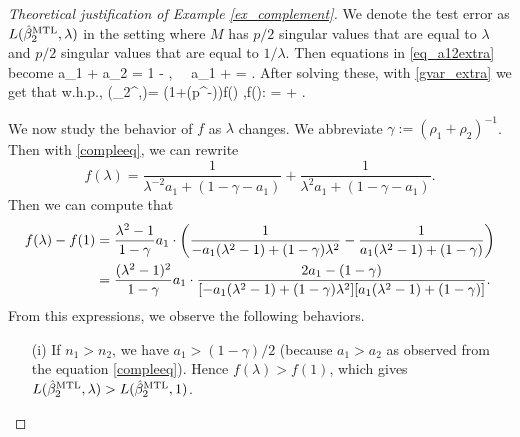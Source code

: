 \begin{proof}[Theoretical justification of Example \ref{ex_complement}]
We denote the test error as $L(\hat \beta_{2}^{\text{MTL}},\lambda)$ in the setting where $M$ has $p/2$ singular values that are equal to $\lambda$ and $p/2$ singular values that are equal to $1 / \lambda$. Then equations in \eqref{eq_a12extra} become
\be\label{compleeq} a_1 + a_2 = 1 - ,  \ \ a_1 + \cdot {} = . \ee
After solving these, with \eqref{gvar_extra} we get that w.h.p.,
\be\label{testcomple}
 \te(\hat \beta_{2}^{\MTL},\lambda)= (1+\OO(p^{-\e}))\cdot f(\lambda) ,\quad f(\lambda): =  + .\ee


We now study the behavior of $f$ as $\lambda$ changes. 
We abbreviate $\gamma:=(\rho_1 + \rho_2)^{-1}$. Then with \eqref{compleeq}, we can rewrite
$$f(\lambda)= \frac{1}{\lambda^{-2}{a_1} + (1-\gamma - a_1)} + \frac{1}{\lambda^2a_1 + (1-\gamma - a_1)}.$$
Then we can compute that
\begin{align*}
f(\lambda) - f(1)&= \frac{ \lambda^2-1}{1-\gamma} a_1\cdot \left({  \frac{1}{ -a_1(\lambda^2-1)+(1-\gamma)\lambda^2 } - \frac{1}{a_1(\lambda^2-1) + (1-\gamma)}}\right) \\
&= \frac{(\lambda^2-1)^2}{1-\gamma}  a_1\cdot  \frac{2a_1 - (1-\gamma) }{[-a_1(\lambda^2-1)+(1-\gamma)\lambda^2 ][a_1(\lambda^2-1) + (1-\gamma)]} .
\end{align*}
From this expressions, we observe the following behaviors.
\begin{itemize}
\item[(i)] If $n_1>n_2$, we have $a_1>(1-\gamma)/2$ (because $a_1>a_2$ as observed from the equation \eqref{compleeq}). Hence $f(\lambda)>f(1)$, which gives $L(\hat \beta_{2}^{\text{MTL}},\lambda)>L(\hat \beta_{2}^{\text{MTL}},1)$.


\end{itemize}
\end{proof}

